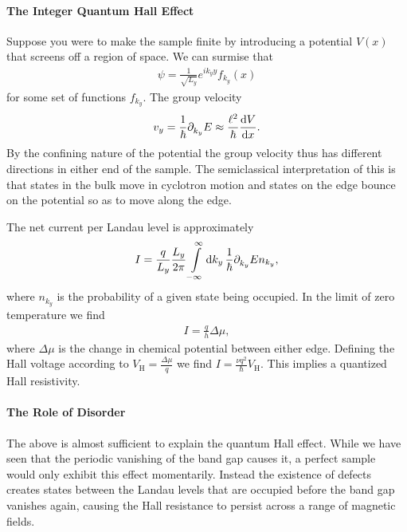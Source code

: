 \paragraph{The Integer Quantum Hall Effect}
Suppose you were to make the sample finite by introducing a potential $V(x)$ that screens off a region of space. We can surmise that
\begin{align*}
	\psi = \frac{1}{\sqrt{L_{y}}}e^{ik_{y}y}f_{k_{y}}(x)
\end{align*}
for some set of functions $f_{k_{y}}$. The group velocity
\begin{align*}
	v_{y} = \frac{1}{\hbar}\partial^{}_{k_{y}}E \approx \frac{\ell^{2}}{\hbar}\dv{V}{x}.
\end{align*}
By the confining nature of the potential the group velocity thus has different directions in either end of the sample. The semiclassical interpretation of this is that states in the bulk move in cyclotron motion and states on the edge bounce on the potential so as to move along the edge.

The net current per Landau level is approximately
\begin{align*}
	I = \frac{q}{L_{y}}\frac{L_{y}}{2\pi}\int\limits_{-\infty}^{\infty}\dd{k_{y}}\frac{1}{\hbar}\partial^{}_{k_{y}}En_{k_{y}},
\end{align*}
where $n_{k_{y}}$ is the probability of a given state being occupied. In the limit of zero temperature we find
\begin{align*}
	I = \frac{q}{h}\Delta\mu,
\end{align*}
where $\Delta\mu$ is the change in chemical potential between either edge. Defining the Hall voltage according to $V_{\text{H}} = \frac{\Delta\mu}{q}$ we find $I = \frac{\nu q^{2}}{\hbar}V_{\text{H}}$. This implies a quantized Hall resistivity.

\paragraph{The Role of Disorder}
The above is almost sufficient to explain the quantum Hall effect. While we have seen that the periodic vanishing of the band gap causes it, a perfect sample would only exhibit this effect momentarily. Instead the existence of defects creates states between the Landau levels that are occupied before the band gap vanishes again, causing the Hall resistance to persist across a range of magnetic fields.

